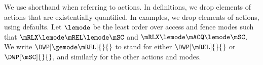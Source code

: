 We use shorthand when referring to actions.  In definitions, we drop elements
of actions that are existentially quantified.  In examples, we drop elements
of actions, using defaults.
% 
Let $\lemode$ be the least order over access and fence modes such that
$\mRLX\lemode\mREL\lemode\mSC$ and $\mRLX\lemode\mACQ\lemode\mSC$.
We write $\DWP[\gemode\mREL]{}{}$ to stand for either $\DWP[\mREL]{}{}$ or
$\DWP[\mSC]{}{}$, and similarly for the other actions and modes.



